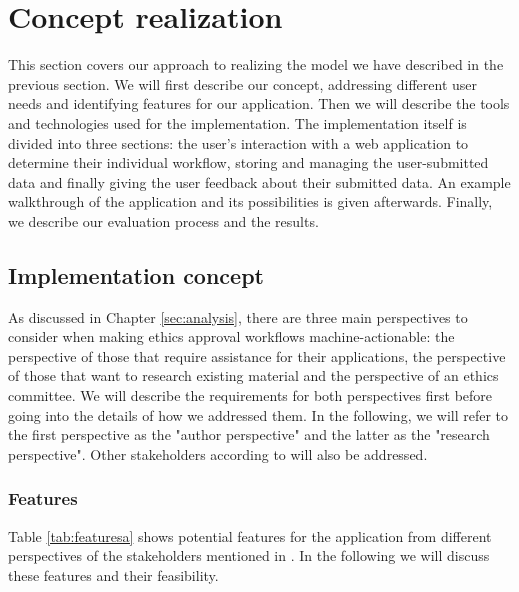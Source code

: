 \documentclass[10pt]{article}
\begin{document}
\section{Concept realization}
\label{sec:implementation}
This section covers our approach to realizing the model we have described in the previous section. We will first describe our concept, addressing different user needs and identifying features for our application. Then we will describe the tools and technologies used for the implementation. The implementation itself is divided into three sections: the user's interaction with a web application to determine their individual workflow, storing and managing the user-submitted data and finally giving the user feedback about their submitted data. An example walkthrough of the application and its possibilities is given afterwards. Finally, we describe our evaluation process and the results.



\subsection{Implementation concept}
As discussed in Chapter \ref{sec:analysis}, there are three main perspectives to consider when making ethics approval workflows machine-actionable: 
the perspective of those that require assistance for their applications, the perspective of those that want to research existing material and the perspective of an ethics committee. 
We will describe the requirements for both perspectives first before going into the details of how we addressed them. In the following, we will refer to the first perspective as the "author perspective" and the latter as the "research perspective". Other stakeholders according to \cite{madmp} will also be addressed.


\subsubsection*{Features}
Table \ref{tab:featuresa} shows potential features for the application from different perspectives of the stakeholders mentioned in \cite{madmp}. In the following we will discuss these features and their feasibility.
\end{document}
